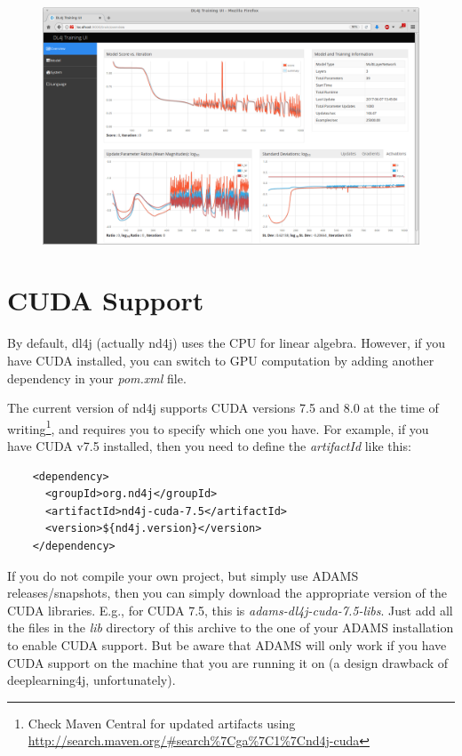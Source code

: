 \documentclass[a4paper]{book}
\begin{document}
\begin{figure}[htb]
  \centering
  \includegraphics[width=12.0cm]{images/stats_iteration_listener.png}
  \label{stats_iteration_listener}
\end{figure}


\chapter{CUDA Support}
By default, dl4j (actually nd4j\cite{nd4j}) uses the CPU for linear algebra.
However, if you have CUDA installed, you can switch to GPU computation by
adding another dependency in your \textit{pom.xml} file.

The current version of nd4j supports CUDA\cite{cuda} versions
7.5 and 8.0 at the time of writing\footnote{Check Maven Central for updated
artifacts using \url{http://search.maven.org/\#search\%7Cga\%7C1\%7Cnd4j-cuda}{}},
and requires you to specify which one you have.
For example, if you have CUDA v7.5 installed, then you need to define the
\textit{artifactId} like this:

\begin{verbatim}
    <dependency>
      <groupId>org.nd4j</groupId>
      <artifactId>nd4j-cuda-7.5</artifactId>
      <version>${nd4j.version}</version>
    </dependency>
\end{verbatim}

If you do not compile your own project, but simply use ADAMS releases/snapshots,
then you can simply download the appropriate version of the CUDA libraries. E.g.,
for CUDA 7.5, this is \textit{adams-dl4j-cuda-7.5-libs}. Just add all the
files in the \textit{lib} directory of this archive to the one of your ADAMS
installation to enable CUDA support. But be aware that ADAMS will only work
if you have CUDA support on the machine that you are running it on (a
design drawback of deeplearning4j, unfortunately).
\end{document}
